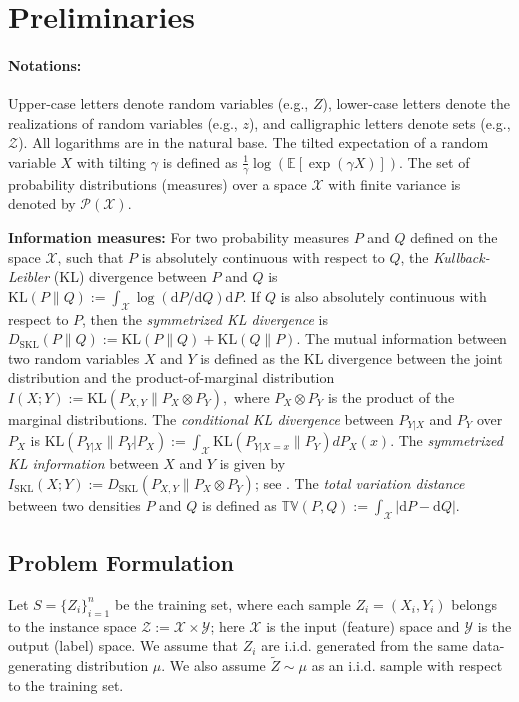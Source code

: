 \documentclass{article}
\theoremstyle{plain}
\theoremstyle{plain}
\theoremstyle{definition}
\theoremstyle{remark}
\newcommand{\mrd}{\mathrm{d}}
\newcommand{\SKL}{D_{\mathrm{SKL}}}
\newcommand{\KLr}{\mathrm{KL}}
\newcommand{\mbE}{\mathbb{E}}
\begin{document}
\section{Preliminaries}\label{sec:prelim}
\paragraph{Notations:} %
Upper-case letters denote random variables (e.g., $Z$), lower-case letters denote the realizations of random variables (e.g., $z$), and calligraphic letters denote sets (e.g., $\mathcal{Z}$). 
All logarithms are in the natural base. The tilted expectation of a random variable $X$ with tilting $\gamma$ is defined as $\frac{1}{\gamma}\log(\mbE[\exp(\gamma X)])$. The set of 
probability distributions (measures) over a space $\mathcal{X}$ with finite variance is denoted by $\mathcal{P}(\mathcal{X})$.

\textbf{Information measures:} For two probability measures $P$ and $Q$ defined on the space $\mathcal{X}$, such that $P$ is absolutely continuous with respect to $Q$,  the \textit{Kullback-Leibler} (KL) divergence between $P$ and $Q$ is %
$\KLr(P\|Q):=\int_\mathcal{X}\log\left({\mrd P}/{\mrd Q}\right) \mrd P.$  If $Q$ is also absolutely continuous with respect to $P$, then the \textit{symmetrized KL divergence} is  $\SKL(P\|Q):= \KLr(P \| Q) + \KLr(Q\|P).$ 
 The mutual information between two random variables $X$ and $Y$ is defined as the KL divergence between the joint distribution and the product-of-marginal
distribution  $I(X;Y):= \KLr(P_{X,Y}\|P_X\otimes P_{Y}),$ where $P_X\otimes P_{Y}$ is the product of the marginal distributions. The \textit{conditional KL divergence} between $P_{Y|X}$ and $P_Y$ over $P_X$ is $\KLr(P_{Y|X} \| P_Y|P_{X}):=\int_\mathcal{X}\KLr(P_{Y|X=x} \| P_Y)dP_{X}(x).$  The \textit{symmetrized KL information} between $X$ and $Y$ is given by $I_{\mathrm{SKL}}(X;Y):= \SKL(P_{X,Y}\|P_X\otimes P_Y)$; see \citet{aminian2015capacity}. The \textit{total variation distance} between two densities $P$ and $Q$ is defined as $\mathbb{TV}(P,Q):=\int_{\mathcal{X}} |\mrd P-\mrd Q|.$

\subsection{ Problem Formulation}
Let $S = \{Z_i\}_{i=1}^n$ be the training set, where each sample $Z_i=(X_i,Y_i)$ belongs to the instance space $\mathcal{Z}:=\mathcal{X}\times \mathcal{Y}$; here $\mathcal{X}$ is the input (feature) space and $\mathcal{Y}$ is the output (label) space. We assume that $Z_i$ are i.i.d. generated from the same data-generating distribution $\mu$. We also assume $\tilde{Z}\sim \mu$ as an i.i.d. sample with respect to the training set.
\end{document}
